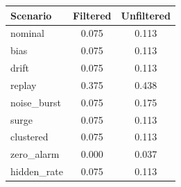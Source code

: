 \begin{tabular}{lcc}
\toprule
Scenario & Filtered & Unfiltered \\
\midrule
nominal & 0.075 & 0.113 \\
bias & 0.075 & 0.113 \\
drift & 0.075 & 0.113 \\
replay & 0.375 & 0.438 \\
noise\_burst & 0.075 & 0.175 \\
surge & 0.075 & 0.113 \\
clustered & 0.075 & 0.113 \\
zero\_alarm & 0.000 & 0.037 \\
hidden\_rate & 0.075 & 0.113 \\
\bottomrule
\end{tabular}
